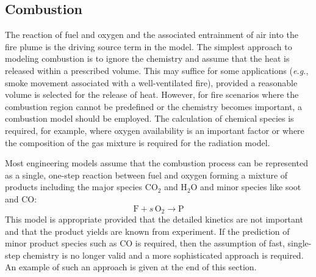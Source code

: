 \documentclass[graybox]{svmult}
\begin{document}
\subsection{Combustion}

The reaction of fuel and oxygen and the associated entrainment of air into the fire plume is the driving source term in the model. The simplest approach to modeling combustion is to ignore the chemistry and assume that the heat is released within a prescribed volume. This may suffice for some applications ({\em e.g.}, smoke movement associated with a well-ventilated fire), provided a reasonable volume is selected for the release of heat. However, for fire scenarios where the combustion region cannot be predefined or the chemistry becomes important, a combustion model should be employed. The calculation of chemical species is required, for example, where oxygen availability is an important factor or where the composition of the gas mixture is required for the radiation model.

Most engineering models assume that the combustion process can be represented as a single, one-step reaction between fuel and oxygen forming a mixture of products including the major species CO$_2$ and H$_2$O and minor species like soot and CO:
\begin{equation}
\mathrm{F} + s \, \mathrm{O_2} \rightarrow \mathrm{P}
\label{eq:simplereac}
\end{equation}
This model is appropriate provided that the detailed kinetics are not important and that the product yields are known from experiment. If the prediction of minor product species such as CO is required, then the assumption of fast, single-step chemistry is no longer valid and a more sophisticated approach is required. An example of such an approach is given at the end of this section.
\end{document}
